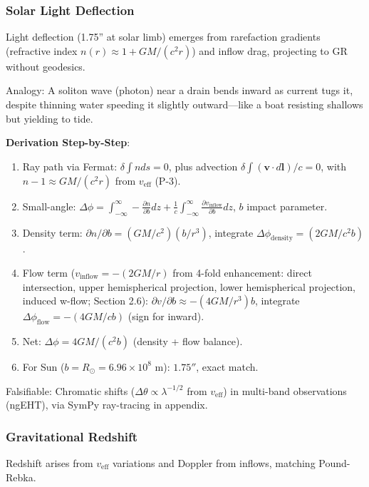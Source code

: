 \documentclass{article}
\begin{document}
\subsubsection{Solar Light Deflection}

Light deflection (1.75'' at solar limb) emerges from rarefaction gradients (refractive index $n(r) \approx 1 + GM/(c^2 r)$) and inflow drag, projecting to GR without geodesics.

Analogy: A soliton wave (photon) near a drain bends inward as current tugs it, despite thinning water speeding it slightly outward—like a boat resisting shallows but yielding to tide.

\textbf{Derivation Step-by-Step}:
\begin{enumerate}
    \item Ray path via Fermat: $\delta \int n ds = 0$, plus advection $\delta \int (\mathbf{v} \cdot d\mathbf{l}) / c = 0$, with $n-1 \approx GM / (c^2 r)$ from $v_{\text{eff}}$ (P-3).
    \item Small-angle: $\Delta\phi = \int_{-\infty}^\infty -\frac{\partial n}{\partial b} dz + \frac{1}{c} \int_{-\infty}^\infty \frac{\partial v_{\text{inflow}}}{\partial b} dz$, $b$ impact parameter.
    \item Density term: $\partial n / \partial b = (GM / c^2) (b / r^3)$, integrate $\Delta\phi_{\text{density}} = (2 GM / c^2 b)$.
    \item Flow term ($v_{\text{inflow}} = - (2 GM / r)$ from 4-fold enhancement: direct intersection, upper hemispherical projection, lower hemispherical projection, induced w-flow; Section 2.6): $\partial v / \partial b \approx - (4 GM / r^3) b$, integrate $\Delta\phi_{\text{flow}} = - (4 GM / c b)$ (sign for inward).
    \item Net: $\Delta\phi = 4 GM / (c^2 b)$ (density + flow balance).
    \item For Sun ($b = R_\odot = 6.96 \times 10^8$ m): $1.75''$, exact match.
\end{enumerate}

Falsifiable: Chromatic shifts ($\Delta\theta \propto \lambda^{-1/2}$ from $v_{\text{eff}}$) in multi-band observations (ngEHT), via SymPy ray-tracing in appendix.

\subsubsection{Gravitational Redshift}

Redshift arises from $v_{\text{eff}}$ variations and Doppler from inflows, matching Pound-Rebka.
\end{document}
